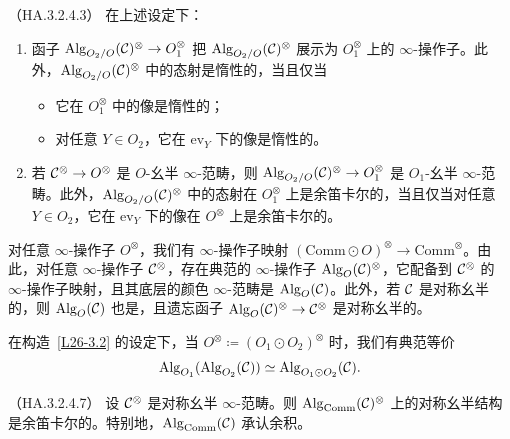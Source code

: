 \begin{proposition}\label{L26-3.5}（HA.3.2.4.3）
在上述设定下：
\begin{enumerate}[label=(\arabic*),leftmargin=2.4em,itemsep=0.1em]
\item 函子 $\operatorname{Alg}_{O_{2}/O}(\mathcal{C})^{\otimes}\to O_{1}^{\otimes}$ 把 $\operatorname{Alg}_{O_{2}/O}(\mathcal{C})^{\otimes}$ 展示为 $O_{1}^{\otimes}$ 上的 $\infty$-操作子。此外，$\operatorname{Alg}_{O_{2}/O}(\mathcal{C})^{\otimes}$ 中的态射是惰性的，当且仅当
\begin{itemize}[leftmargin=2.2em,itemsep=0.1em]
\item 它在 $O_{1}^{\otimes}$ 中的像是惰性的；
\item 对任意 $Y\in O_{2}$，它在 $\mathrm{ev}_{Y}$ 下的像是惰性的。
\end{itemize}
\item 若 $\mathcal{C}^{\otimes}\to O^{\otimes}$ 是 $O$-幺半 $\infty$-范畴，则 $\operatorname{Alg}_{O_{2}/O}(\mathcal{C})^{\otimes}\to O_{1}^{\otimes}$ 是 $O_{1}$-幺半 $\infty$-范畴。此外，$\operatorname{Alg}_{O_{2}/O}(\mathcal{C})^{\otimes}$ 中的态射在 $O_{1}^{\otimes}$ 上是余笛卡尔的，当且仅当对任意 $Y\in O_{2}$，它在 $\mathrm{ev}_{Y}$ 下的像在 $O^{\otimes}$ 上是余笛卡尔的。
\end{enumerate}
\end{proposition}

\begin{example}\label{L26-3.6}
对任意 $\infty$-操作子 $O^{\otimes}$，我们有 $\infty$-操作子映射 $(\mathrm{Comm}\odot O)^{\otimes}\to\mathrm{Comm}^{\otimes}$。由此，对任意 $\infty$-操作子 $\mathcal{C}^{\otimes}$，存在典范的 $\infty$-操作子 $\operatorname{Alg}_{O}(\mathcal{C})^{\otimes}$，它配备到 $\mathcal{C}^{\otimes}$ 的 $\infty$-操作子映射，且其底层的颜色 $\infty$-范畴是 $\operatorname{Alg}_{O}(\mathcal{C})$。此外，若 $\mathcal{C}$ 是对称幺半的，则 $\operatorname{Alg}_{O}(\mathcal{C})$ 也是，且遗忘函子 $\operatorname{Alg}_{O}(\mathcal{C})^{\otimes}\to\mathcal{C}^{\otimes}$ 是对称幺半的。
\end{example}

\begin{exercise}\label{L26-3.7}
在构造~\ref{L26-3.2} 的设定下，当 $O^{\otimes}\coloneqq(O_{1}\odot O_{2})^{\otimes}$ 时，我们有典范等价
\[
\operatorname{Alg}_{O_{1}}(\operatorname{Alg}_{O_{2}}(\mathcal{C}))\simeq\operatorname{Alg}_{O_{1}\odot O_{2}}(\mathcal{C}).
\]
\end{exercise}

\begin{proposition}\label{L26-3.8}（HA.3.2.4.7）
设 $\mathcal{C}^{\otimes}$ 是对称幺半 $\infty$-范畴。则 $\operatorname{Alg}_{\mathrm{Comm}}(\mathcal{C})^{\otimes}$ 上的对称幺半结构是余笛卡尔的。特别地，$\operatorname{Alg}_{\mathrm{Comm}}(\mathcal{C})$ 承认余积。
\end{proposition}

